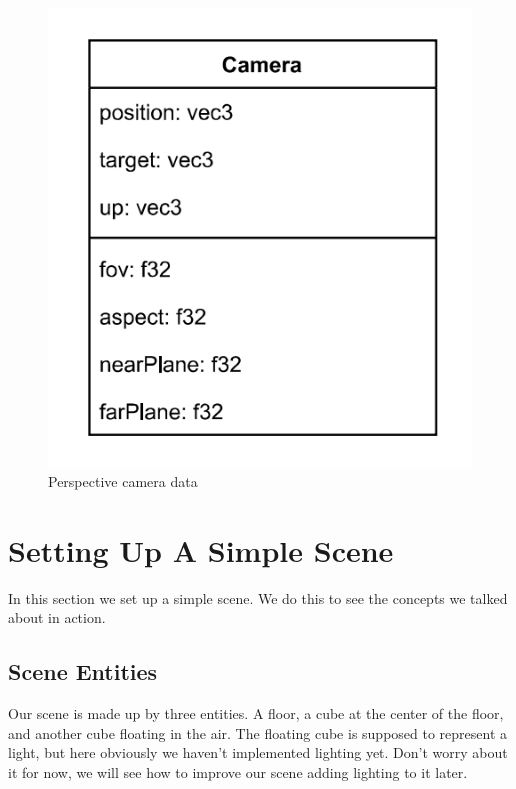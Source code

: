 \begin{figure}[ht]
    \centering
    \includegraphics[scale=0.40]{images/ChScene/CameraData.png}
    \caption{Perspective camera data}
    \label{fig::CameraData}
\end{figure}

\section{Setting Up A Simple Scene}

In this section we set up a simple scene.
We do this to see the concepts we talked about in action.

\subsection{Scene Entities}

Our scene is made up by three entities.
A floor, a cube at the center of the floor, and another cube floating in the air.
The floating cube is supposed to represent a light, but here obviously we haven't
implemented lighting yet.
Don't worry about it for now, we will see how to improve our scene adding lighting
to it later.

\begin{minipage}{\linewidth}{\noindent}
    
\end{minipage}

